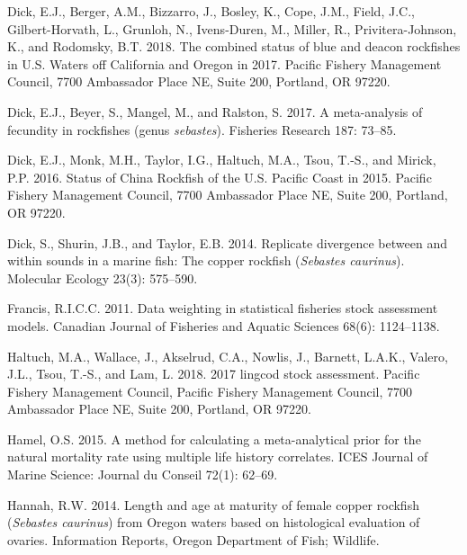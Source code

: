 \documentclass[11pt,
  english,
  a4paper,
]{article}
\newlength{\cslhangindent}
\newenvironment{CSLReferences}[2] %
 {%
  \setlength{\parindent}{0pt}
  \ifodd #1 \everypar{\setlength{\hangindent}{\cslhangindent}}\ignorespaces\fi
  \ifnum #2 > 0
  \setlength{\parskip}{#2\baselineskip}
  \fi
 }%
 {}
\begin{document}
\begin{CSLReferences}{1}{0}
\leavevmode{}%
Dick, E.J., Berger, A.M., Bizzarro, J., Bosley, K., Cope, J.M., Field, J.C., Gilbert-Horvath, L., Grunloh, N., Ivens-Duren, M., Miller, R., Privitera-Johnson, K., and Rodomsky, B.T. 2018. The combined status of blue and deacon rockfishes in {U}.{S}. Waters off {California} and {Oregon} in 2017. Pacific Fishery Management Council, 7700 Ambassador Place NE, Suite 200, Portland, OR 97220.

\leavevmode{}%
Dick, E.J., Beyer, S., Mangel, M., and Ralston, S. 2017. A meta-analysis of fecundity in rockfishes (genus \emph{sebastes}). Fisheries Research 187: 73--85.

\leavevmode{}%
Dick, E.J., Monk, M.H., Taylor, I.G., Haltuch, M.A., Tsou, T.-S., and Mirick, P.P. 2016. Status of {China} {Rockfish} of the {U}.{S}. {Pacific} {Coast} in 2015. Pacific Fishery Management Council, 7700 Ambassador Place NE, Suite 200, Portland, OR 97220.

\leavevmode{}%
Dick, S., Shurin, J.B., and Taylor, E.B. 2014. Replicate divergence between and within sounds in a marine fish: The copper rockfish (\emph{{Sebastes} caurinus}). Molecular Ecology 23(3): 575--590.

\leavevmode{}%
Francis, R.I.C.C. 2011. Data weighting in statistical fisheries stock assessment models. Canadian Journal of Fisheries and Aquatic Sciences 68(6): 1124--1138.

\leavevmode{}%
Haltuch, M.A., Wallace, J., Akselrud, C.A., Nowlis, J., Barnett, L.A.K., Valero, J.L., Tsou, T.-S., and Lam, L. 2018. 2017 lingcod stock assessment. Pacific Fishery Management Council, Pacific Fishery Management Council, 7700 Ambassador Place NE, Suite 200, Portland, OR 97220.

\leavevmode{}%
Hamel, O.S. 2015. A method for calculating a meta-analytical prior for the natural mortality rate using multiple life history correlates. ICES Journal of Marine Science: Journal du Conseil 72(1): 62--69.

\leavevmode{}%
Hannah, R.W. 2014. Length and age at maturity of female copper rockfish (\emph{{Sebastes} caurinus}) from {Oregon} waters based on histological evaluation of ovaries. Information Reports, Oregon Department of Fish; Wildlife.


\end{CSLReferences}
\end{document}
